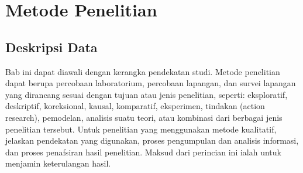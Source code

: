 \chapter{Metode Penelitian}\label{Metode}

\section{Deskripsi Data}
Bab ini dapat diawali dengan kerangka pendekatan studi. Metode penelitian dapat berupa percobaan laboratorium, percobaan lapangan, dan survei lapangan yang dirancang sesuai dengan tujuan atau jenis penelitian, seperti: eksploratif, deskriptif, koreksional, kausal, komparatif, eksperimen, tindakan (action research), pemodelan, analisis suatu teori, atau kombinasi dari berbagai jenis penelitian tersebut. Untuk penelitian yang menggunakan metode kualitatif, jelaskan pendekatan yang  digunakan, proses pengumpulan dan analisis informasi, dan proses penafsiran hasil penelitian. Maksud dari perincian ini ialah untuk menjamin keterulangan hasil.


 